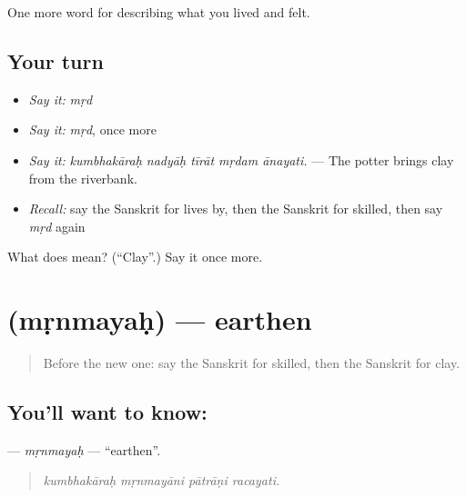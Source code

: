 \begin{grammarlens}[title={What you've built}]
One more word for describing what you lived and felt.
\end{grammarlens}

\subsection*{Your turn}
\begin{itemize}
\raggedright
  \item \emph{Say it:} \emph{mṛd}
  \item \emph{Say it:} \emph{mṛd}, once more
  \item \emph{Say it:} \emph{kumbhakāraḥ nadyāḥ tīrāt mṛdam ānayati.} — The potter brings clay from the riverbank.
  \item \emph{Recall:} say the Sanskrit for lives by, then the Sanskrit for skilled, then say \emph{mṛd} again
\end{itemize}

\begin{tcolorbox}[breakable,colback=teal!4,colframe=teal!35!black,title={Before you move on}]
What does  mean? (\textquotedblleft{}Clay\textquotedblright{}.) Say it once more.
\end{tcolorbox}
\section[\texorpdfstring{\sk{मृन्मयः} (mṛnmayaḥ)}{मृन्मयः (mṛnmayaḥ)}]{ (mṛnmayaḥ) — earthen}

\label{lesson:SA-C505-mrnmayah}



\begin{quote}
Before the new one: say the Sanskrit for skilled, then the Sanskrit for clay.
\end{quote}

\subsection*{You'll want to know: }
\textbf{} — \emph{mṛnmayaḥ} — \textquotedblleft{}earthen\textquotedblright{}.

\begin{quote}
   
\end{quote}

\begin{quote}
\emph{kumbhakāraḥ mṛnmayāni pātrāṇi racayati.}
\end{quote}

